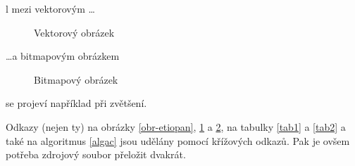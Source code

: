 \documentclass[a4paper, 11pt, ]{article}
\begin{document}
l mezi vektorovým \dots
\begin{figure}[htb]
\caption{Vektorový obrázek}
\label{obr-vektor}
\end{figure}
\dots a bitmapovým obrázkem
\begin{figure}[htb]
\caption{Bitmapový obrázek}
\label{obr-bitmap}
\end{figure}

\noindent
se projeví například při zvětšení.

Odkazy (nejen ty) na obrázky \ref{obr-etiopan}, \ref{obr-vektor} a \ref{obr-bitmap}, na  
tabulky \ref{tab1} a \ref{tab2} a také na algoritmus \ref{algac} jsou udělány pomocí 
křížových odkazů. Pak je ovšem potřeba zdrojový soubor přeložit dvakrát.
\end{document}
